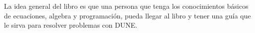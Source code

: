 La idea general del libro es que una persona que tenga los conocimientos básicos
de ecuaciones, algebra y programación, pueda llegar al libro y tener una 
guía que le sirva para resolver problemas con DUNE.